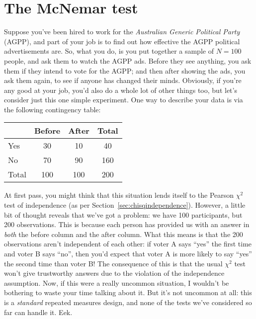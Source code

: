 \section{The McNemar test\label{sec:mcnemar}}

Suppose you've been hired to work for the {\it Australian Generic Political Party} (AGPP), and part of your job is to find out how effective the AGPP political advertisements are. So, what you do, is you put together a sample of $N=100$ people, and ask them to watch the AGPP ads. Before they see anything, you ask them if they intend to vote for the AGPP; and then after showing the ads, you ask them again, to see if anyone has changed their minds. Obviously, if you're any good at your job, you'd also do a whole lot of other things too, but let's consider just this one simple experiment. One way to describe your data is via the following contingency table:

\begin{center}
\begin{tabular}{l|cc|c}
& Before & After & Total \\ \hline
Yes   & 30 & 10 & 40 \\
No    & 70 & 90 & 160 \\ \hline
Total & 100 & 100 & 200
\end{tabular}
\end{center}

\noindent
At first pass, you might think that this situation lends itself to the Pearson $\chi^2$ test of independence (as per Section~\ref{sec:chisqindependence}). However, a little bit of thought reveals that we've got a problem: we have 100 participants, but 200 observations. This is because each person has provided us with an answer in {\it both} the before column and the after column. What this means is that the 200 observations aren't independent of each other: if voter A says ``yes'' the first time and voter B says ``no'', then you'd expect that voter A is more likely to say ``yes'' the second time than voter B! The consequence of this is that the usual $\chi^2$ test won't give trustworthy answers due to the violation of the independence assumption. Now, if this were a really uncommon situation, I wouldn't be bothering to waste your time talking about it. But it's not uncommon at all: this is a {\it standard} repeated measures design, and none of the tests we've considered so far can handle it. Eek. 

